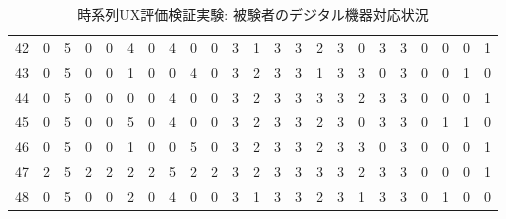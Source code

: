 \begin{table}[htbp]
{\begin{tabular}{lllllllllllllllllllllll}
42                  & 0 & 5 & 0 & 0 & 4 & 0 & 4 & 0 & 0 & 3 & 1 & 3 & 3 & 2 & 3 & 0 & 3 & 3 & 0                  & 0                   & 0                   & 1                   \\
43                  & 0 & 5 & 0 & 0 & 1 & 0 & 0 & 4 & 0 & 3 & 2 & 3 & 3 & 1 & 3 & 3 & 0 & 3 & 0                  & 0                   & 1                   &     0                \\
44                  & 0 & 5 & 0 & 0 & 0 & 0 & 4 & 0 & 0 & 3 & 2 & 3 & 3 & 3 & 3 & 2 & 3 & 3 & 0                  & 0                   & 0                   & 1                   \\
45                  & 0 & 5 & 0 & 0 & 5 & 0 & 4 & 0 & 0 & 3 & 2 & 3 & 3 & 2 & 3 & 0 & 3 & 3 & 0                  & 1                   & 1                   &   0                  \\
46                  & 0 & 5 & 0 & 0 & 1 & 0 & 0 & 5 & 0 & 3 & 2 & 3 & 3 & 2 & 3 & 3 & 0 & 3 & 0                  & 0                   & 0                   & 1                   \\
47                  & 2 & 5 & 2 & 2 & 2 & 2 & 5 & 2 & 2 & 3 & 2 & 3 & 3 & 3 & 3 & 2 & 3 & 3 & 0                  & 0                   & 0                   & 1                   \\
48                  & 0 & 5 & 0 & 0 & 2 & 0 & 4 & 0 & 0 & 3 & 1 & 3 & 3 & 2 & 3 & 1 & 3 & 3 & 0                  & 1                   & 0                   & 0                   \\ \hline
\end{tabular}
}
\caption{時系列UX評価検証実験: 被験者のデジタル機器対応状況}
\label{table:exp2result2}
\end{table}
